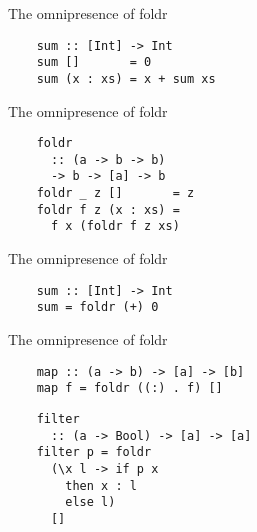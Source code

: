 \documentclass[20pt]{beamer}
\begin{document}
\begin{frame}[fragile]{The omnipresence of foldr}
    \begin{lstlisting}
    sum :: [Int] -> Int
    sum []       = 0
    sum (x : xs) = x + sum xs
    \end{lstlisting}
\end{frame}

\begin{frame}[fragile]{The omnipresence of foldr}
    \begin{lstlisting}
    foldr
      :: (a -> b -> b)
      -> b -> [a] -> b
    foldr _ z []       = z
    foldr f z (x : xs) =
      f x (foldr f z xs)
    \end{lstlisting}
\end{frame}

\begin{frame}[fragile]{The omnipresence of foldr}
    \begin{lstlisting}
    sum :: [Int] -> Int
    sum = foldr (+) 0
    \end{lstlisting}
\end{frame}

\begin{frame}[fragile]{The omnipresence of foldr}
    \begin{lstlisting}
    map :: (a -> b) -> [a] -> [b]
    map f = foldr ((:) . f) []
    \end{lstlisting}

    \begin{lstlisting}
    filter
      :: (a -> Bool) -> [a] -> [a]
    filter p = foldr
      (\x l -> if p x
        then x : l
        else l)
      []
    \end{lstlisting}
\end{frame}
\end{document}
